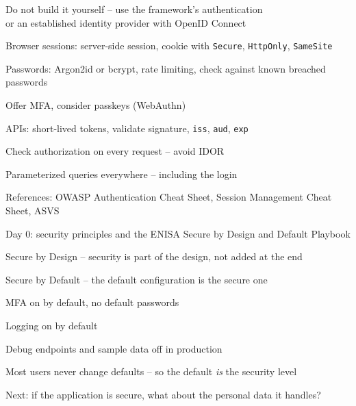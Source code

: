 \documentclass[Screen16to9,17pt]{foils}
\begin{document}

\begin{list2}
\item Do not build it yourself -- use the framework's authentication\\
  or an established identity provider with OpenID Connect
\item Browser sessions: server-side session, cookie with \verb+Secure+, \verb+HttpOnly+, \verb+SameSite+
\item Passwords: Argon2id or bcrypt, rate limiting, check against known breached passwords
\item Offer MFA, consider passkeys (WebAuthn)
\item APIs: short-lived tokens, validate signature, \verb+iss+, \verb+aud+, \verb+exp+
\item Check authorization on every request -- avoid IDOR
\item Parameterized queries everywhere -- including the login
\item References: OWASP Authentication Cheat Sheet, Session Management Cheat Sheet, ASVS\\
\end{list2}



\begin{list2}
\item Day 0: security principles and the ENISA Secure by Design and Default Playbook
\item Secure by Design -- security is part of the design, not added at the end
\item Secure by Default -- the default configuration is the secure one
\begin{list2}
\item MFA on by default, no default passwords
\item Logging on by default
\item Debug endpoints and sample data off in production
\end{list2}
\item Most users never change defaults -- so the default \emph{is} the security level
\item Next: if the application is secure, what about the personal data it handles?
\end{list2}


\end{document}
